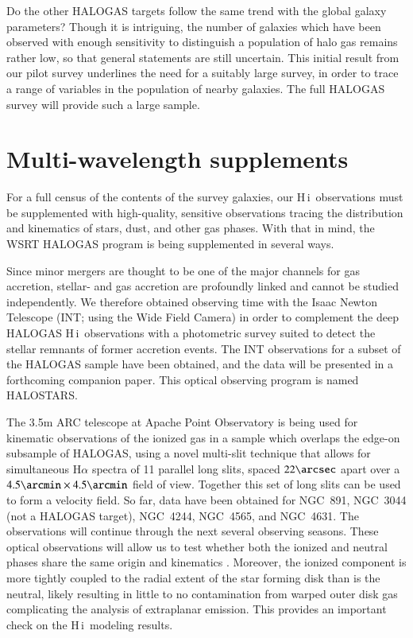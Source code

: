 \documentclass[oldversion]{aa}
\newcommand{\HI}{{\sc H\,i}}
\begin{document}
Do the other HALOGAS targets follow the same trend with the global galaxy parameters? Though it is intriguing, the number of galaxies which have been observed with enough sensitivity to distinguish a population of halo gas remains rather low, so that general statements are still uncertain. This initial result from our pilot survey underlines the need for a suitably large survey, in order to trace a range of variables in the population of nearby galaxies. The full HALOGAS survey will provide such a large sample.

\section{Multi-wavelength supplements}\label{section:multiwavelength}

For a full census of the contents of the survey galaxies, our \HI\ observations must be supplemented with high-quality, sensitive observations tracing the distribution and kinematics of stars, dust, and other gas phases. With that in mind, the WSRT HALOGAS program is being supplemented in several ways.

Since minor mergers are thought to be one of the major channels for gas accretion, stellar- and gas accretion are profoundly linked and cannot be studied independently. We therefore obtained observing time with the Isaac Newton Telescope (INT; using the Wide Field Camera) in order to complement the deep HALOGAS \HI\ observations with a photometric survey suited to detect the stellar remnants of former accretion events. The INT observations for a subset of the HALOGAS sample have been obtained, and the data will be presented in a forthcoming companion paper. This optical observing program is named HALOSTARS.

The 3.5m ARC telescope at Apache Point Observatory is being used for kinematic observations of the ionized gas in a sample which overlaps the edge-on subsample of HALOGAS, using a novel multi-slit technique that allows for simultaneous H$\alpha$ spectra of 11 parallel long slits, spaced $22\arcsec$ apart over a $4.5\arcmin\times4.5\arcmin$ field of view. Together this set of long slits can be used to form a velocity field. So far, data have been obtained for NGC~891, NGC~3044 (not a HALOGAS target), NGC~4244, NGC~4565, and NGC~4631. The observations will continue through the next several observing seasons. These optical observations will allow us to test whether both the ionized and neutral phases share the same origin and kinematics \citep[as has been previously investigated in NGC~891;][]{heald_etal_2006}. Moreover, the ionized component is more tightly coupled to the radial extent of the star forming disk than is the neutral, likely resulting in little to no contamination from warped outer disk gas complicating the analysis of extraplanar emission. This provides an important check on the \HI\ modeling results.
\end{document}

